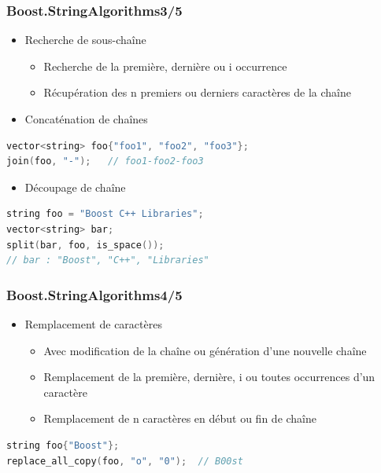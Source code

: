 \documentclass[C++.tex]{subfiles}
\begin{document}
\begin{frame}[fragile]
	\frametitle{Boost.StringAlgorithms\titlehfill{}3/5}
	\begin{itemize}
		\item Recherche de sous-chaîne
		\begin{itemize}
			\item Recherche de la première, dernière ou i\ieme{} occurrence
			\item Récupération des n premiers ou derniers caractères de la chaîne
		\end{itemize}
		\item Concaténation de chaînes
	\end{itemize}

	\begin{lstlisting}[language=C++]
vector<string> foo{"foo1", "foo2", "foo3"};
join(foo, "-");   // foo1-foo2-foo3\end{lstlisting}

	\begin{itemize}
		\item Découpage de chaîne
	\end{itemize}

	\begin{lstlisting}[language=C++]
string foo = "Boost C++ Libraries";
vector<string> bar;
split(bar, foo, is_space());
// bar : "Boost", "C++", "Libraries"\end{lstlisting}
\end{frame}

\begin{frame}[fragile]
	\frametitle{Boost.StringAlgorithms\titlehfill{}4/5}
	\begin{itemize}
		\item Remplacement de caractères
		\begin{itemize}
			\item Avec modification de la chaîne ou génération d'une nouvelle chaîne
			\item Remplacement de la première, dernière, i\ieme{} ou toutes occurrences d'un caractère
			\item Remplacement de n caractères en début ou fin de chaîne
		\end{itemize}
	\end{itemize}

	\begin{lstlisting}[language=C++]
string foo{"Boost"};
replace_all_copy(foo, "o", "0");  // B00st\end{lstlisting}
\end{frame}
\end{document}
